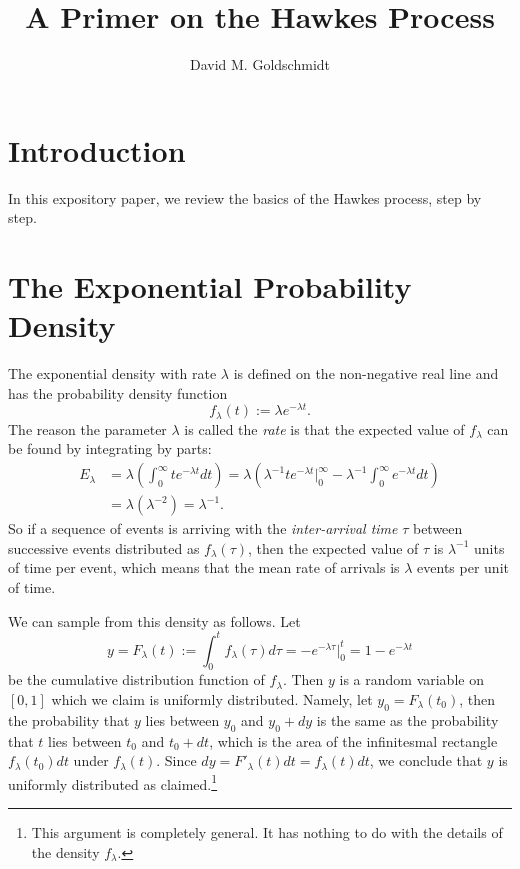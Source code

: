 \documentclass[12pt,leqno]{article}
\title{A Primer on the Hawkes Process}
\author{David M. Goldschmidt}
\begin{document}
\newcommand{\p}{\ensuremath{u}}
\newcommand{\VV}{V}
\maketitle


\section{Introduction}
In this expository paper, we review the basics of the Hawkes process, step by step.

\section{The Exponential Probability Density}
The exponential density with rate $\lambda$ is defined on the non-negative real line and has the probability
density function
\begin{equation}
  f_{\lambda}(t) := {\lambda}e^{-\lambda{t}}.
\end{equation}
The reason the parameter $\lambda$ is called the {\em rate} is that the expected value of $f_{\lambda}$ can be found by
integrating by parts:
\begin{align*}
E_{\lambda} &= \lambda\left(\int_0^{\infty}te^{-\lambda{t}}dt\right) = \lambda\left(\lambda^{-1}{t}e^{-\lambda{t}}\biggr\rvert_0^{\infty}
-\lambda^{-1}\int_0^{\infty}e^{-\lambda{t}}dt\right)\\
&= \lambda(\lambda^{-2}) = \lambda^{-1}.
\end{align*}
So if a sequence of events is arriving with the {\em inter-arrival time} $\tau$ between successive events
distributed as $f_{\lambda}(\tau)$, then the expected value of $\tau$ is $\lambda^{-1}$ units of time per
event, which means that the mean rate of arrivals is $\lambda$ events per unit of time.

We can sample from this density as follows.  Let
\begin{equation} \label{y=F(t)}
y = F_{\lambda}(t) := \int_0^{t}f_{\lambda}(\tau)d\tau = -e^{-\lambda\tau}\biggr\rvert_0^t = 1 - e^{-\lambda{t}}
\end{equation}
be the cumulative distribution function of $f_{\lambda}$. Then $y$ is a random variable on $[0,1]$ which we claim
is uniformly distributed.  Namely, let $y_0 = F_{\lambda}(t_0)$, then the probability that $y$ lies between $y_0$ and
$y_0+dy$ is the same as the probability that $t$ lies between $t_0$ and $t_0+dt$, which is the area of the
infinitesmal rectangle $f_{\lambda}(t_0)dt$  under $f_{\lambda}(t)$.  Since $dy = F'_{\lambda}(t)dt = f_{\lambda}(t)dt$,
we conclude that $y$ is uniformly distributed as claimed.\footnote{This argument is completely general.  It has nothing to do with the details of the density $f_{\lambda}$.}
\end{document}

